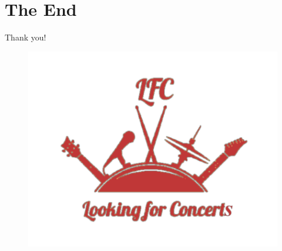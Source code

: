 \documentclass{beamer}
\begin{document}
\section{The End}

\begin{frame}{Thank you!}
	\begin{figure}[t]
		\centering
		\includegraphics[height=\dimexpr6\textheight/16\relax]{images/logodark}
	\end{figure}
\end{frame}
\end{document}
